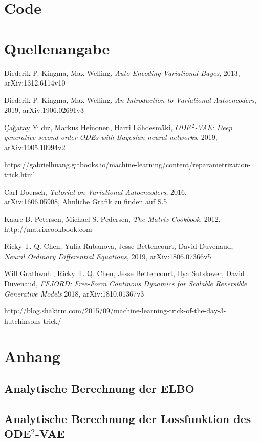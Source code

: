 \documentclass[12pt]{article}
\begin{document}
	\section[Code]{Code}

	\section[Quellenangabe]{Quellenangabe}
	\begin{thebibliography}{9}
		Diederik P. Kingma, Max Welling,
		\textit{Auto-Encoding Variational Bayes},
		2013,\\
		arXiv:1312.6114v10

		Diederik P. Kingma, Max Welling,
		\textit{An Introduction to Variational Autoencoders},
		2019,
		arXiv:1906.02691v3

		Çağatay Yıldız, Markus Heinonen, Harri Lähdesmäki,
		\textit{ODE$^{\ 2}$-VAE: Deep generative second order ODEs with Bayesian neural networks},
		2019,
		arXiv:1905.10994v2

		https://gabrielhuang.gitbooks.io/machine-learning/content/reparametrization-trick.html

		Carl Doersch,
		\textit{Tutorial on Variational Autoencoders},
		2016,\\
		arXiv:1606.05908,
		Ähnliche Grafik zu finden auf S.5

		Kaare B. Petersen, Michael S. Pedersen,
		\textit{The Matrix Cookbook},
		2012,
		http://matrixcookbook.com%

		Ricky T. Q. Chen, Yulia Rubanova, Jesse Bettencourt, David Duvenaud,\\
		\textit{Neural Ordinary Differential Equations},
		2019, arXiv:1806.07366v5

		Will Grathwohl, Ricky T. Q. Chen, Jesse Bettencourt, Ilya Sutskever, David Duvenaud,
		\textit{FFJORD:  Free-Form Continous Dynamics for Scalable Reversible Generative Models}
		2018, arXiv:1810.01367v3

		http://blog.shakirm.com/2015/09/machine-learning-trick-of-the-day-3-hutchinsons-trick/

	\end{thebibliography}
	\section[Anhang]{Anhang}
	\subsection[Analytische Berechnung der ELBO]{Analytische Berechnung der ELBO}
	\subsection[Analytische Berechnung der Lossfunktion des ODE$^2$-VAE]{Analytische Berechnung der Lossfunktion des ODE$^2$-VAE}
\end{document}
